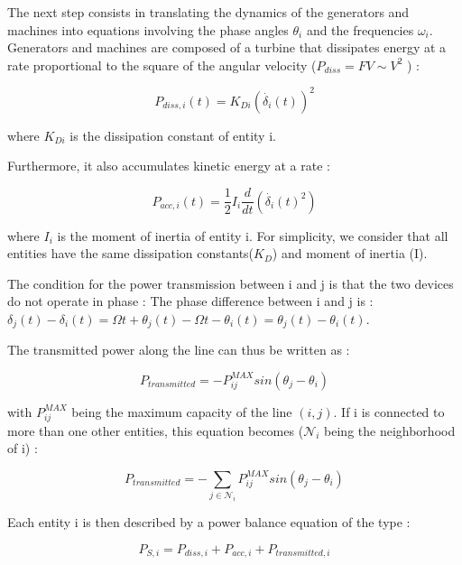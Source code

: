 \documentclass[10pt,twoside%
                ,draft%
        ]{article}
\begin{document}
The next step consists in translating the dynamics of the generators and machines into equations involving the phase angles $ \theta_i $ and the frequencies $ \omega_i$. Generators and machines are composed of a turbine that dissipates energy at a rate proportional to the square of the angular velocity ($P_{diss} = FV \sim V^2 $ ) : 

\begin{equation}
  P_{diss, i}(t) = K_{Di}(\dot{\delta_i}(t))^2 
\end{equation}

where $ K_{Di} $ is the dissipation constant of entity i.

Furthermore, it also accumulates kinetic energy at a rate : 

\begin{equation} 
P_{acc,i}(t) = \frac{1}{2}I_i\frac{d}{dt} \left( \dot{ \delta_i }(t)^2 \right)
\end{equation} 

where $ I_{i}$ is the moment of inertia of entity i. For simplicity, we consider that all entities have the same dissipation constants($K_D$) and moment of inertia (I).

The condition for the power transmission between i and j is that the two devices do not operate in phase : The phase difference between i and j is : $ \delta_j(t) - \delta_i(t) = \Omega t + \theta_j(t) - \Omega t - \theta_i(t) = \theta_j(t) - \theta_i(t) $.

The transmitted power along the line can thus be written as : 

\begin{equation}
 P_{transmitted} = - P_{ij}^{MAX} sin( \theta_j - \theta_i )
\end{equation}
  
with $ P_{ij}^{MAX} $ being the maximum capacity of the line $(i,j)$. If i is connected to more than one other entities, this equation becomes ($\mathcal{N}_i$ being the neighborhood of  i) : 

\begin{equation}
  P_{transmitted} = - \sum_{j \in \mathcal{N}_i} P_{ij}^{MAX} sin( \theta_j - \theta_i ) 
\end{equation}


Each entity i is then described by a power balance equation of the type :

\begin{equation}
 P_{S,i}  =  P_{diss,i} + P_{acc,i} + P_{transmitted,i} 
\end{equation}
\end{document}
